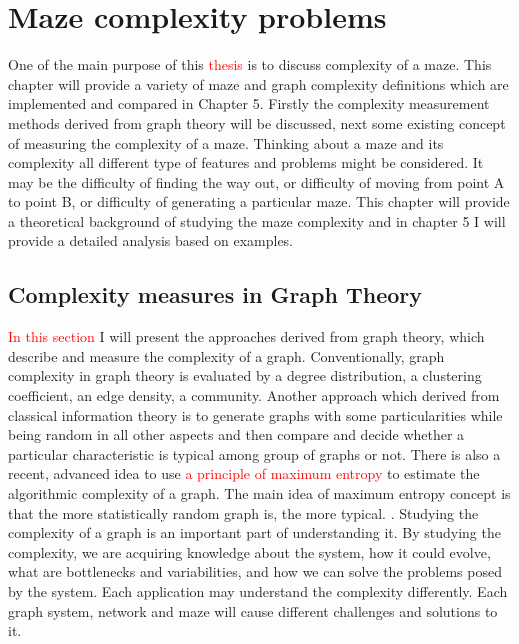 \chapter{Maze complexity problems}\label{cha:background}
One of the main purpose of this \textcolor{red}{thesis} is to discuss complexity of a maze. This chapter will provide a variety of maze and graph complexity definitions which are implemented and compared in Chapter 5. Firstly the complexity measurement methods derived from graph theory will be discussed, 
next some existing concept of measuring the complexity of a maze. Thinking about a maze and its complexity all different type of features and problems might be considered. 
It may be the difficulty of finding the way out, or difficulty of moving from point A to point B, or difficulty of generating a particular maze. This chapter will provide a theoretical background of studying the maze complexity and in chapter 5 I will provide a detailed analysis based on examples. 
\section{Complexity measures in Graph Theory}
\textcolor{red}{In this section} I will present the approaches derived from graph theory, which describe and measure the complexity of a graph.
 Conventionally, graph complexity in graph theory is evaluated by a degree distribution, a clustering coefficient, an edge density, a community. Another approach which derived from classical information theory is to generate graphs with some particularities while being random in all other aspects and then compare and decide whether a particular characteristic is typical among group of graphs or not.
There is also a recent, advanced idea to use \textcolor{red}{a principle of maximum entropy} to estimate the algorithmic complexity of a graph. The main idea of maximum entropy concept is that the more statistically random graph is, the more typical. \cite{Zenil}. 
Studying the complexity of a graph is an important part of understanding it. By studying the complexity, we are acquiring knowledge about the system, how it could evolve, what are bottlenecks and variabilities, and how we can solve the problems posed by the system. Each application may understand the complexity differently. 
Each graph system, network and maze will cause different challenges and solutions to it. 
